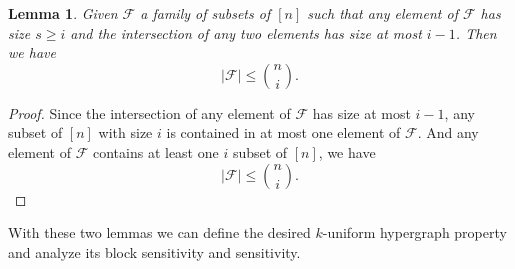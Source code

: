 \documentclass[psamsfonts]{amsart}
\newtheorem{lem}[theorem]{Lemma}
\theoremstyle{definition}
\theoremstyle{remark}
\numberwithin{equation}{section}
\begin{document}
	\begin{lem}
		Given $\mathcal{F}$ a family of subsets of $[n]$ such that any element of $\mathcal{F}$ has size $s \geq i$ and the intersection of any two elements has size at most $i-1$. Then we have
		\begin{equation}
			|\mathcal{F}| \leq {n \choose{i}}. \nonumber
		\end{equation}
	\end{lem}
	\begin{proof}
		Since the intersection of any element of $\mathcal{F}$ has size at most $i-1$, any subset of $[n]$ with size $i$ is contained in at most one element of $\mathcal{F}$. And any element of $\mathcal{F}$ contains at least one $i$ subset of $[n]$, we have 
		\begin{equation}
			|\mathcal{F}| \leq {n \choose{i}}. \nonumber
		\end{equation}
	\end{proof}
	With these two lemmas we can define the desired $k$-uniform hypergraph property and analyze its block sensitivity and sensitivity.
\end{document}

